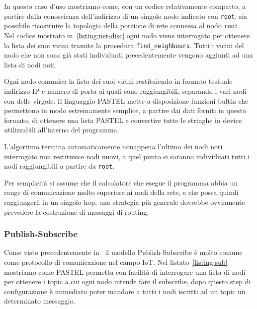 \documentclass[]{article}
\begin{document}
In questo caso d'uso mostriamo come, con un codice relativamente compatto, a partire dalla conoscienza dell'indirizzo di un singolo nodo indicato con \texttt{root}, sia possibile ricostruire la topologia della porzione di rete connessa al nodo \texttt{root}.\\
Nel codice mostrato in~\ref{listing:net-disc} ogni nodo viene interrogato per ottenere la lista dei suoi vicini tramite la procedura \texttt{find\_neighbours}. Tutti i vicini del nodo che non sono già stati individuati precedentemente vengono aggiunti ad una lista di nodi noti.

Ogni nodo comunica la lista dei suoi vicini restituiendo in formato testuale indirizzo IP e numero di porta ai quali sono raggiungibili, separando i vari nodi con delle virgole. Il linguaggio PASTEL mette a disposizione funzioni bultin che permettono in modo estremamente semplice, a partire dai dati forniti in questo formato, di ottenere una lista PASTEL e convertire tutte le stringhe in device utilizzabili all'interno del programma.

L'algoritmo termina automaticamente nonappena l'ultimo dei nodi noti interrogato non restituisce nodi nuovi, a quel punto si saranno individuati tutti i nodi raggiungibili a partire da \texttt{root}.

Per semplicità si assume che il calcolatore che esegue il programma abbia un range di comunicazione molto superiore ai nodi della rete, e che possa quindi raggiungerli in un singolo hop, una strategia più generale dovrebbe ovviamente prevedere la costruzione di messaggi di routing.



\subsubsection{Publish-Subscribe}\label{subsubsection:pub-sub}

Come visto precedentemente in~\cite{tandale2017empirical} il modello Publish-Subscribe è molto comune come protocollo di comunicazione nel campo IoT. Nel listato~\ref{listing:sub} mostriamo come PASTEL permetta con facilità di interrogare una lista di nodi per ottenere i topic a cui ogni nodo intende fare il subscribe, dopo questo step di configurazione è immediato poter mandare a tutti i nodi iscritti ad un topic un determinato messaggio.
\end{document}
